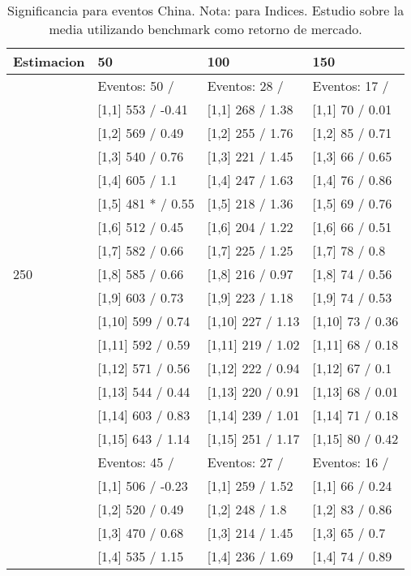 \begin{table}

\caption{Significancia para eventos China. Nota: para Indices. Estudio sobre la media utilizando benchmark como retorno de mercado.}
\centering
\begin{tabular}[t]{llll}
\toprule
Estimacion & 50 & 100 & 150\\
\midrule
 & Eventos:  50 / & Eventos:  28 / & Eventos:  17 /\\
 & {}[1,1] 553  / -0.41 & {}[1,1] 268  / 1.38 & {}[1,1] 70  / 0.01\\
 & {}[1,2] 569  / 0.49 & {}[1,2] 255  / 1.76 & {}[1,2] 85  / 0.71\\
 & {}[1,3] 540  / 0.76 & {}[1,3] 221  / 1.45 & {}[1,3] 66  / 0.65\\
 & {}[1,4] 605  / 1.1 & {}[1,4] 247  / 1.63 & {}[1,4] 76  / 0.86\\
\addlinespace
 & {}[1,5] 481 * / 0.55 & {}[1,5] 218  / 1.36 & {}[1,5] 69  / 0.76\\
 & {}[1,6] 512  / 0.45 & {}[1,6] 204  / 1.22 & {}[1,6] 66  / 0.51\\
 & {}[1,7] 582  / 0.66 & {}[1,7] 225  / 1.25 & {}[1,7] 78  / 0.8\\
250 & {}[1,8] 585  / 0.66 & {}[1,8] 216  / 0.97 & {}[1,8] 74  / 0.56\\
 & {}[1,9] 603  / 0.73 & {}[1,9] 223  / 1.18 & {}[1,9] 74  / 0.53\\
\addlinespace
 & {}[1,10] 599  / 0.74 & {}[1,10] 227  / 1.13 & {}[1,10] 73  / 0.36\\
 & {}[1,11] 592  / 0.59 & {}[1,11] 219  / 1.02 & {}[1,11] 68  / 0.18\\
 & {}[1,12] 571  / 0.56 & {}[1,12] 222  / 0.94 & {}[1,12] 67  / 0.1\\
 & {}[1,13] 544  / 0.44 & {}[1,13] 220  / 0.91 & {}[1,13] 68  / 0.01\\
 & {}[1,14] 603  / 0.83 & {}[1,14] 239  / 1.01 & {}[1,14] 71  / 0.18\\
\addlinespace
 & {}[1,15] 643  / 1.14 & {}[1,15] 251  / 1.17 & {}[1,15] 80  / 0.42\\
 & Eventos:  45 / & Eventos:  27 / & Eventos:  16 /\\
 & {}[1,1] 506  / -0.23 & {}[1,1] 259  / 1.52 & {}[1,1] 66  / 0.24\\
 & {}[1,2] 520  / 0.49 & {}[1,2] 248  / 1.8 & {}[1,2] 83  / 0.86\\
 & {}[1,3] 470  / 0.68 & {}[1,3] 214  / 1.45 & {}[1,3] 65  / 0.7\\
\addlinespace
 & {}[1,4] 535  / 1.15 & {}[1,4] 236  / 1.69 & {}[1,4] 74  / 0.89\\

\end{tabular}
\end{table}

